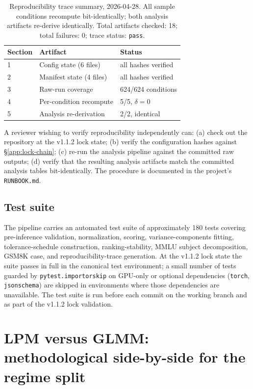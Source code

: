\documentclass[11pt]{article}
\begin{document}
\begin{table}[h]
\centering
\small
\caption{Reproducibility trace summary, 2026-04-28. All sample conditions recompute bit-identically; both analysis artifacts re-derive identically. Total artifacts checked: 18; total failures: 0; trace status: \texttt{pass}.}
\label{tab:repro-trace}
\begin{tabular}{lll}
\toprule
Section & Artifact & Status \\
\midrule
1 & Config state (6 files) & all hashes verified \\
2 & Manifest state (4 files) & all hashes verified \\
3 & Raw-run coverage & 624/624 conditions \\
4 & Per-condition recompute & 5/5, $\delta = 0$ \\
5 & Analysis re-derivation & 2/2, identical \\
\bottomrule
\end{tabular}
\end{table}

A reviewer wishing to verify reproducibility independently can: (a) check out the repository at the v1.1.2 lock state; (b) verify the configuration hashes against §\ref{app:lock-chain}; (c) re-run the analysis pipeline against the committed raw outputs; (d) verify that the resulting analysis artifacts match the committed analysis tables bit-identically. The procedure is documented in the project's \texttt{RUNBOOK.md}.

\subsection{Test suite}
\label{app:test-suite}

The pipeline carries an automated test suite of approximately 180 tests covering pre-inference validation, normalization, scoring, variance-components fitting, tolerance-schedule construction, ranking-stability, MMLU subject decomposition, GSM8K case, and reproducibility-trace generation. At the v1.1.2 lock state the suite passes in full in the canonical test environment; a small number of tests guarded by \texttt{pytest.importorskip} on GPU-only or optional dependencies (\texttt{torch}, \texttt{jsonschema}) are skipped in environments where those dependencies are unavailable. The test suite is run before each commit on the working branch and as part of the v1.1.2 lock validation.

\section{LPM versus GLMM: methodological side-by-side for the regime split}
\label{app:lpm-glmm}
\end{document}
